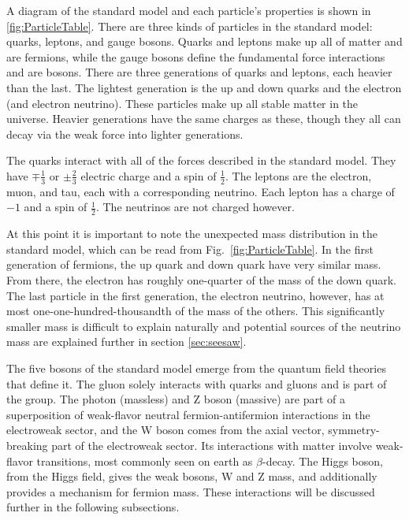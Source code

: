 A diagram of the standard model and each particle's properties is shown in \ref{fig:ParticleTable}.  There are three kinds of particles in the standard model: quarks, leptons, and gauge bosons.  Quarks and leptons make up all of matter and are fermions, while the gauge bosons define the fundamental force interactions and are bosons. There are three generations of quarks and leptons, each heavier than the last.  The lightest generation is the up and down quarks and the electron (and electron neutrino). These particles make up all stable matter in the universe.  Heavier generations have the same charges as these, though they all can decay via the weak force into lighter generations. 

The quarks interact with all of the forces described in the standard model.  They have \ensuremath{\mp\frac{1}{3}} or \ensuremath{\pm\frac{2}{3}} electric charge and a spin of \ensuremath{\frac{1}{2}}. The leptons are the electron, muon, and tau, each with a corresponding neutrino.  Each lepton has a charge of \ensuremath{-1} and a spin of \ensuremath{\frac{1}{2}}.  The neutrinos are not charged however.

At this point it is important to note the unexpected mass distribution in the standard model, which can be read from Fig.~\ref{fig:ParticleTable}. In the first generation of fermions, the up quark and down quark have very similar mass.  From there, the electron has roughly one-quarter of the mass of the down quark. The last particle in the first generation, the electron neutrino, however, has at most one-one-hundred-thousandth of the mass of the others. This significantly smaller mass is difficult to explain naturally and potential sources of the neutrino mass are explained further in section \ref{sec:seesaw}.  

The five bosons of the standard model emerge from the quantum field theories that define it.  The gluon solely interacts with quarks and gluons and is part of the \SUthree group.  The photon (massless) and Z boson (massive) are part of a superposition of weak-flavor neutral fermion-antifermion interactions in the electroweak sector, and the W boson comes from the axial vector, symmetry-breaking part of the electroweak sector.  Its interactions with matter involve weak-flavor transitions, most commonly seen on earth as \ensuremath{\beta}-decay. The Higgs boson, from the Higgs field, gives the weak bosons, W and Z mass, and additionally provides a mechanism for fermion mass.  These interactions will be discussed further in the following subsections.

